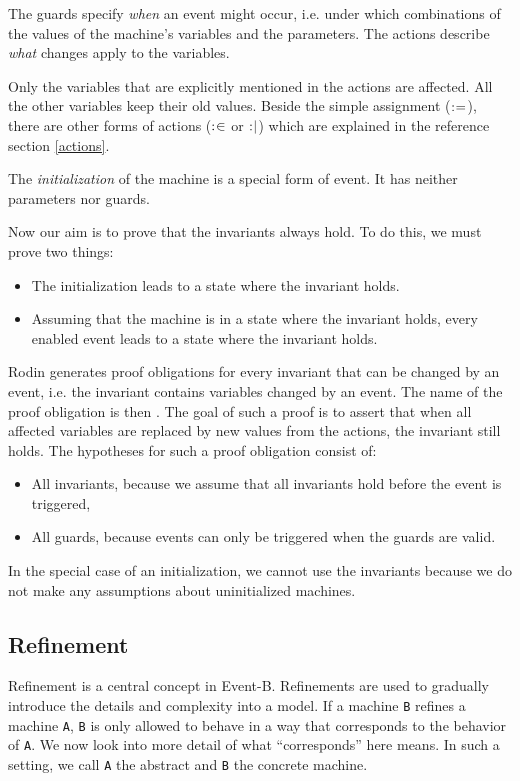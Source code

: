 The guards specify \emph{when} an event might occur, i.e. under which combinations
of the values of the machine's variables and the parameters.
The actions describe \emph{what} changes apply to the variables.

Only the variables that are explicitly mentioned in the actions are affected.
All the other variables keep their old values. Beside the simple assignment ($\mathrel{:\mkern1mu=}$),
there are other forms of actions ($\mathrel{:\mkern1mu\in}$ or $\mathrel{:\mkern1mu\mid}$) which are explained in
the reference section \ref{actions}.

The \emph{initialization} of the machine is a special form of event. It has neither parameters
nor guards.

Now our aim is to prove that the invariants always hold. To do this, we must prove two things:
\begin{itemize}
  \item The initialization leads to a state where the invariant holds.
  \item Assuming that the machine is in a state where the invariant holds,
    every enabled event leads to a state where the invariant holds.
\end{itemize}

Rodin generates proof obligations for every invariant that can be changed by an event, i.e. the invariant contains variables changed by an event.
The name of the proof obligation is then .
The goal of such a proof is to assert that when all affected variables are replaced by new values from the actions, the invariant still holds. The hypotheses for such a proof obligation consist of:

\begin{itemize}

\item All invariants, because we assume that all invariants hold before the event is triggered,
\item All guards, because events can only be triggered when the guards are valid.
\end{itemize}

In the special case of an initialization, we cannot use the invariants because we do not
make any assumptions about uninitialized machines.

\subsection{Refinement}
\label{tut_refinement}
Refinement is a central concept in Event-B. Refinements are used to gradually
introduce the details and complexity into a model.
If a machine \texttt{B} refines a machine \texttt{A}, \texttt{B} is only allowed to behave in a way that
corresponds to the behavior of \texttt{A}. We now look into more detail of what ``corresponds''
here means.
In such a setting, we call \texttt{A} the abstract and \texttt{B} the concrete machine.

